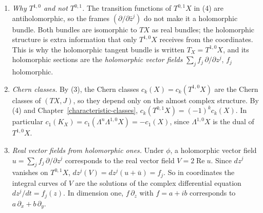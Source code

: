 \begin{remark}\label{complex-manifolds:remark-holomorphic-tangent}
\begin{enumerate}
\item \emph{Why $T^{1,0}$ and not $T^{0,1}$.} The transition functions of $T^{0,1}X$ in (4) are antiholomorphic, so the frames $(\partial/\partial\bar z^j)$ do not make it a holomorphic bundle. Both bundles are
isomorphic to $TX$ as real bundles; the holomorphic structure is extra information that only $T^{1,0}X$ receives from the coordinates. This is why the holomorphic tangent bundle is written $T_X = T^{1,0}X$,
and its holomorphic sections are the \emph{holomorphic vector fields} $\sum_jf_j\,\partial/\partial z^j$, $f_j$ holomorphic.
\item \emph{Chern classes.} By (3), the Chern classes $c_k(X) = c_k(T^{1,0}X)$ are the Chern classes of $(TX, J)$, so they depend only on the almost complex structure. By (4) and Chapter~\ref{characteristic-classes},
$c_k(T^{0,1}X) = (-1)^kc_k(X)$. In particular $c_1(K_X) = c_1(\Lambda^n\Lambda^{1,0}X) = -c_1(X)$, since $\Lambda^{1,0}X$ is the dual of $T^{1,0}X$.
\item \emph{Real vector fields from holomorphic ones.} Under $\phi$, a holomorphic vector field $u = \sum_jf_j\,\partial/\partial z^j$ corresponds to the real vector field $V = 2\operatorname{Re}u$. Since $dz^j$ vanishes on
$T^{0,1}X$, $dz^j(V) = dz^j(u + \bar u) = f_j$. So in coordinates the integral curves of $V$ are the solutions of the complex differential equation $dz^j/dt = f_j(z)$. In dimension one, $f\,\partial_z$ with $f = a + ib$
corresponds to $a\,\partial_x + b\,\partial_y$.
\end{enumerate}
\end{remark}

